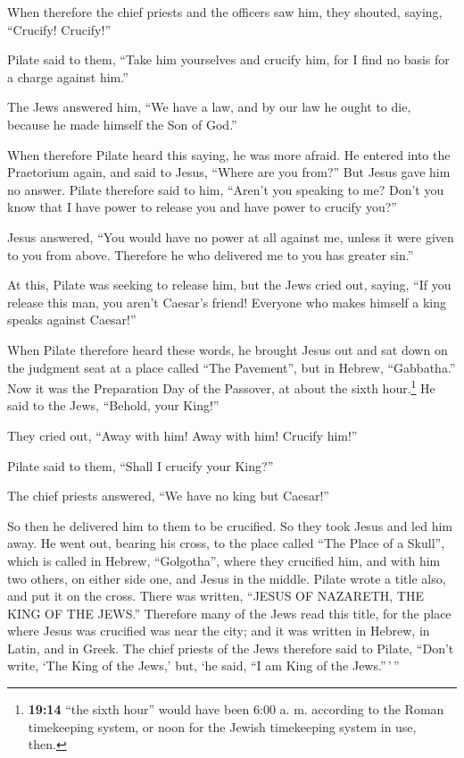  When therefore the chief priests and the officers saw
him, they shouted, saying, ``Crucify! Crucify!''

Pilate said to them, ``Take him yourselves and crucify him, for I find
no basis for a charge against him.''

 The Jews answered him, ``We have a law, and by our law he
ought to die, because he made himself the Son of God.''

 When therefore Pilate heard this saying, he was more
afraid.  He entered into the Praetorium again, and said to
Jesus, ``Where are you from?'' But Jesus gave him no answer.
 Pilate therefore said to him, ``Aren't you speaking to
me? Don't you know that I have power to release you and have power to
crucify you?''

 Jesus answered, ``You would have no power at all against
me, unless it were given to you from above. Therefore he who delivered
me to you has greater sin.''

 At this, Pilate was seeking to release him, but the Jews
cried out, saying, ``If you release this man, you aren't Caesar's
friend! Everyone who makes himself a king speaks against Caesar!''

 When Pilate therefore heard these words, he brought
Jesus out and sat down on the judgment seat at a place called ``The
Pavement'', but in Hebrew, ``Gabbatha.''  Now it was the
Preparation Day of the Passover, at about the sixth hour.\footnote{\textbf{19:14}
  ``the sixth hour'' would have been 6:00 a. m. according to the Roman
  timekeeping system, or noon for the Jewish timekeeping system in use,
  then.} He said to the Jews, ``Behold, your King!''

 They cried out, ``Away with him! Away with him! Crucify
him!''

Pilate said to them, ``Shall I crucify your King?''

The chief priests answered, ``We have no king but Caesar!''

 So then he delivered him to them to be crucified. So
they took Jesus and led him away.  He went out, bearing
his cross, to the place called ``The Place of a Skull'', which is called
in Hebrew, ``Golgotha'',  where they crucified him, and
with him two others, on either side one, and Jesus in the middle.
 Pilate wrote a title also, and put it on the cross.
There was written, ``JESUS OF NAZARETH, THE KING OF THE JEWS.''
 Therefore many of the Jews read this title, for the
place where Jesus was crucified was near the city; and it was written in
Hebrew, in Latin, and in Greek.  The chief priests of the
Jews therefore said to Pilate, ``Don't write, `The King of the Jews,'
but, `he said, ``I am King of the Jews.''\,'\,''


